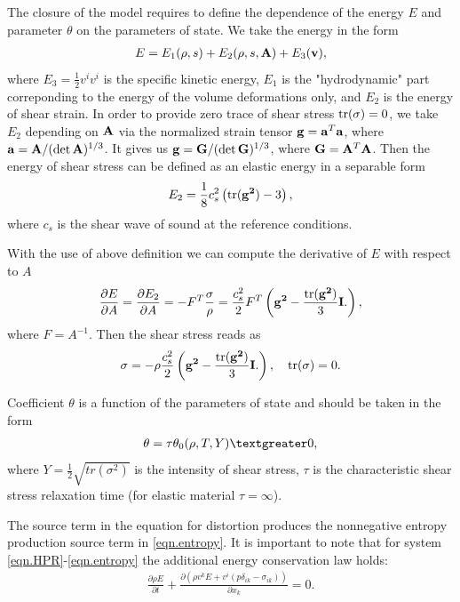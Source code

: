 \documentclass[3p,times]{elsarticle}
\newcommand{\tr}{\textnormal{tr}}
\begin{document}
The closure of the model requires to define the dependence of the energy $E$ and parameter $\theta$ on the parameters of state.
We take the energy in the form
\begin{align}
E=E_1(\rho,s)+E_2(\rho,s,{\bf A})+E_3({\bf v}), \label{energy}
\end{align}
where $E_3=\frac{1}{2}v^iv^i$ is the specific kinetic energy,
$E_1$ is the "hydrodynamic" part correponding to the energy of the volume deformations only,
and $E_2$ is the energy of shear strain.
In order to provide zero trace of shear stress $\tr ({\bf \sigma})=0$, we take $E_2$ depending on ${\bf A}$ via the normalized strain tensor ${\bf g}={\bf a}^T{\bf a}$, where ${\bf a}={\bf A}/(\det {\bf A})^{1/3}$. It gives us ${\bf g}={\bf G}/(\det{\bf G})^{1/3}$, where ${\bf G}={\bf A}^T{\bf A}$. Then the energy of shear stress can be defined as an elastic energy in a separable form \cite{Gavrilyk} 
\begin{align}
E_2=\frac{1}{8}c_s^2\left(\tr({{\bf g^2}})-3\right),
\end{align}
where $c_s$ is the shear wave of sound at the reference conditions.

With the use of above definition we can compute
the derivative of $E$ with respect to $A$
\begin{align} \label{EderivA}
\frac{\partial E}{\partial A}=\frac{\partial E_2}{\partial A}=-F^T\frac{\sigma}{\rho}=
\frac{c_s^2}{2} F^T \left({\bf g^2}-\frac{\tr({{\bf g^2}})}{3} {\bf I}. \right),
\end{align}
where $F=A^{-1}$.
Then the shear stress reads as
\begin{align}
{\bf \sigma}=-\rho \frac{c_s^2}{2}\left({\bf g^2}-\frac{\tr({{\bf g^2}})}{3} {\bf I}. \right), \quad  \tr({\bf \sigma})=0.
\end{align} 

Coefficient $\theta$ is a function of the parameters of state and should be taken in the form 
\begin{align}
\theta = \tau \theta_0(\rho,T,Y) \textgreater 0,
\end{align}
where $Y=\frac{1}{2}\sqrt{tr(\sigma^2)}$ is the intensity of shear stress,
$\tau$ is the characteristic shear stress relaxation time (for elastic material $\tau=\infty$).

The source term in the equation for distortion produces the nonnegative entropy production source term in \eqref{eqn.entropy}. 
It is important to note that for system \eqref{eqn.HPR}-\eqref{eqn.entropy} the additional energy conservation law holds:
\begin{align} \label{eqn.energy}
\displaystyle\frac{\partial \rho E}{\partial t}+
\frac{\partial \left(\rho  v^k E +v^i(p \delta_{ik}-\sigma_{ik}) \right)}{\partial x_k}=0.
\end{align}
\end{document}

